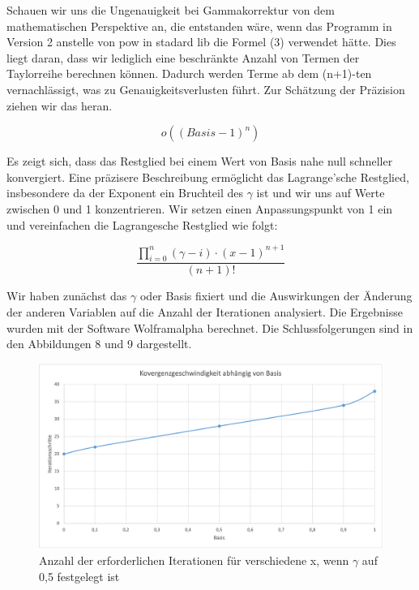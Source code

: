 \documentclass[course=erap]{aspdoc}
\begin{document}
\par
Schauen wir uns die Ungenauigkeit bei Gammakorrektur von dem mathematischen Perspektive an, die entstanden wäre, wenn das Programm in Version 2 anstelle von pow in stadard lib die Formel (3) verwendet hätte. Dies liegt daran, dass wir lediglich eine beschränkte Anzahl von Termen der Taylorreihe berechnen können. Dadurch werden Terme ab dem (n+1)-ten vernachlässigt, was zu Genauigkeitsverlusten führt. Zur Schätzung der Präzision ziehen wir das \cite{mathematiknet2009taylorpolynome} heran.

\[
o\left((Basis-1)^n\right)
\]

\par
Es zeigt sich, dass das Restglied bei einem Wert von Basis nahe null schneller konvergiert. Eine präzisere Beschreibung ermöglicht das Lagrange'sche Restglied\cite{biancahoegel2021taylorformel}, insbesondere da der Exponent ein Bruchteil des $\gamma$ ist und wir uns auf Werte zwischen 0 und 1 konzentrieren. Wir setzen einen Anpassungspunkt von 1 ein und vereinfachen die Lagrangesche Restglied wie folgt:

\[
\frac{{\prod_{i=0}^{n} (\gamma - i) \cdot (x-1)^{n+1}}}{{(n+1)!}} \label{eq:gamma_product}
\]

\par
Wir haben zunächst das $\gamma$ oder Basis fixiert und die Auswirkungen der Änderung der anderen Variablen auf die Anzahl der Iterationen analysiert. Die Ergebnisse wurden mit der Software Wolframalpha berechnet. Die Schlussfolgerungen sind in den Abbildungen 8 und 9 dargestellt.

\begin{figure}[h]
\centering
\includegraphics[width=0.9\linewidth]{Bilder/KonvergenzBasis.png}
\caption{Anzahl der erforderlichen Iterationen für verschiedene x, wenn $\gamma$ auf 0,5 festgelegt ist}
\label{fig:xchange}
\end{figure}
    
\end{document}
